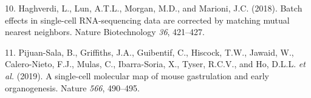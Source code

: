 \documentclass[
]{article}
\newenvironment{cslreferences}%
  {}%
  {\par}
\begin{document}
\begin{cslreferences}
\leavevmode\hypertarget{ref-haghverdiBatchEffectsSinglecell2018}{}%
10. Haghverdi, L., Lun, A.T.L., Morgan, M.D., and Marioni, J.C. (2018). Batch effects in single-cell RNA-sequencing data are corrected by matching mutual nearest neighbors. Nature Biotechnology \emph{36}, 421--427.

\leavevmode\hypertarget{ref-pijuan-salaSinglecellMolecularMap2019}{}%
11. Pijuan-Sala, B., Griffiths, J.A., Guibentif, C., Hiscock, T.W., Jawaid, W., Calero-Nieto, F.J., Mulas, C., Ibarra-Soria, X., Tyser, R.C.V., and Ho, D.L.L. \emph{et al.} (2019). A single-cell molecular map of mouse gastrulation and early organogenesis. Nature \emph{566}, 490--495.
\end{cslreferences}
\end{document}
